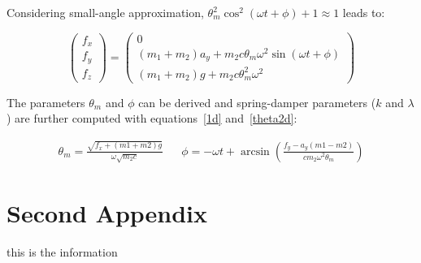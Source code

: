\documentclass[\main/main.tex]{subfiles}
\begin{document}
Considering small-angle  approximation, $\theta_m^2 \cos^2(\omega t + \phi) + 1 \approx 1$ leads to:

\begin{equation}
  \begin{pmatrix}
  f_x \\
  f_y \\
  f_z
  \end{pmatrix}
  =
  \begin{pmatrix}
  0 \\
  (m_1 + m_2) a_y + m_2 c \theta_m \omega^2 \sin(\omega t + \phi) \\
  (m_1 + m_2) g + m_2 c \theta_m^2 \omega^2
  \end{pmatrix}
\end{equation}



The parameters $\theta_m$ and $\phi$ can be derived and spring-damper parameters ($k$ and $\lambda$) are further computed with equations~\eqref{1d} and~\eqref{theta2d}:

\begin{align}
  \theta_m = \frac{\sqrt{f_x + (m1 + m2) g}}{ \omega \sqrt{m_2 c}} &&
  \phi = - \omega t + \arcsin \left( \frac{f_y - a_y (m1 - m2)}{c m_2 \omega^2 \theta_m} \right)
\end{align}



\chapter{Second Appendix}
this is the information
\end{document}
